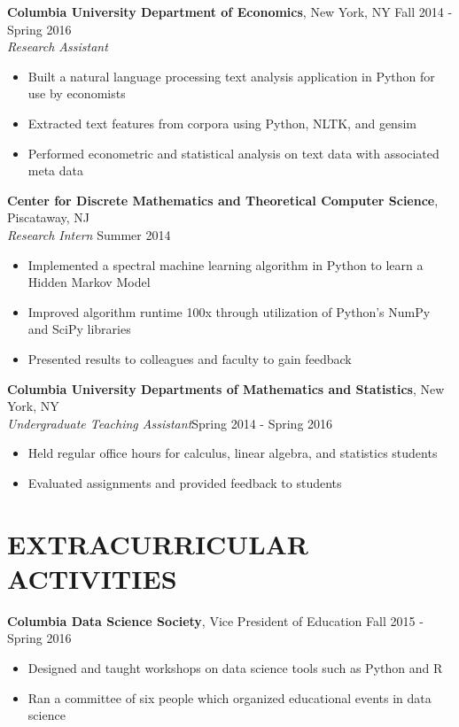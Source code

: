 \documentclass{res}
\begin{document}
\begin{resume}
\textbf{Columbia University Department of Economics}, New York, NY \hfill Fall 2014 - Spring 2016\\
\textit{Research Assistant}
\begin{itemize}
\item Built a natural language processing text analysis application in Python for use by economists 
\item Extracted text features from corpora using Python, NLTK, and gensim
\item Performed econometric and statistical analysis on text data with associated meta data
\end{itemize}



	\textbf{Center for Discrete Mathematics and Theoretical Computer Science}, Piscataway, NJ\\
\textit{Research Intern} \hfill Summer 2014 
\begin{itemize}
\item Implemented a spectral machine learning algorithm in Python to learn a Hidden Markov Model
\item Improved algorithm runtime 100x through utilization of Python's NumPy and SciPy libraries
\item Presented results to colleagues and faculty to gain feedback
\end{itemize}

\textbf{Columbia University Departments of Mathematics and Statistics}, New York, NY
  \\ \textit{Undergraduate Teaching Assistant}\hfill Spring 2014 - Spring 2016
\begin{itemize}
\item Held regular office hours for calculus, linear algebra, and statistics students
\item Evaluated assignments and provided feedback to students
\end{itemize}

\section{EXTRACURRICULAR ACTIVITIES}
	\textbf{Columbia Data Science Society}, Vice President of Education \hfill Fall 2015 - Spring 2016
	\begin{itemize}
	\item Designed and taught workshops on data science tools such as Python and R
	\item Ran a committee of six people which organized educational events in data science
	\end{itemize}
	

\end{resume}
\end{document}
